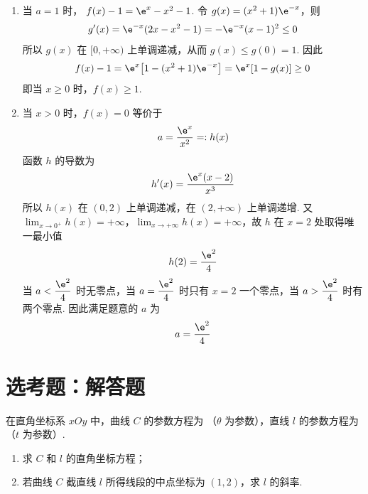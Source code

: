 \begin{solution}
\begin{enumerate}
\item 当 \(a=1\) 时，
\(f(x)-1=\e^x-x^2-1\). 令
\(g(x)=(x^2+1)\e^{-x}\)，则
\[
g'(x)=\e^{-x}(2x-x^2-1)=-\e^{-x}(x-1)^2\le0
\]
所以 \(g(x)\) 在 \([0,+\infty)\) 上单调递减，从而
\(g(x)\le g(0)=1\). 因此
\[
f(x)-1=\e^x\bigl[1-(x^2+1)\e^{-x}\bigr]=\e^x[1-g(x)]\ge0
\]
即当 \(x\ge0\) 时，\(f(x)\ge1\).
\item 当 \(x>0\) 时，\(f(x)=0\) 等价于
\[
a=\frac{\e^x}{x^2}=:h(x)
\]
函数 \(h\) 的导数为
\[
h'(x)=\frac{\e^x(x-2)}{x^3}
\]
所以 \(h(x)\) 在 \((0,2)\) 上单调递减，在 \((2,+\infty)\) 上单调递增. 又
\(\lim_{x\to0^+}h(x)=+\infty\)，\(\lim_{x\to+\infty}h(x)=+\infty\)，故 \(h\) 在 \(x=2\) 处取得唯一最小值
\[
h(2)=\frac{\e^2}{4}
\]
当 \(a<\dfrac{\e^2}{4}\) 时无零点，当 \(a=\dfrac{\e^2}{4}\) 时只有 \(x=2\) 一个零点，当 \(a>\dfrac{\e^2}{4}\) 时有两个零点. 因此满足题意的 \(a\) 为
\[
a=\frac{\e^2}{4}
\]
\end{enumerate}
\end{solution}

\section{选考题：解答题}

\begin{problem}
在直角坐标系 \(xOy\) 中，曲线 \(C\) 的参数方程为
（\(\theta\) 为参数），直线 \(l\) 的参数方程为
（\(t\) 为参数）.

\begin{enumerate}
\item 求 \(C\) 和 \(l\) 的直角坐标方程；
\item 若曲线 \(C\) 截直线 \(l\) 所得线段的中点坐标为 \((1,2)\)，求 \(l\) 的斜率.
\end{enumerate}
\end{problem}

